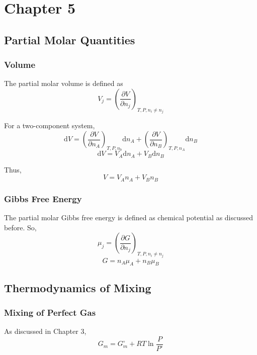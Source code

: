 \documentclass[letterpaper]{article}
\newcommand{\diff}{\mathrm{d}}
\newcommand{\zero}{^\circ}
\begin{document}
\newpage
\section*{Chapter 5}
\subsection*{Partial Molar Quantities}
\subsubsection*{Volume}
The partial molar volume is defined as
\begin{equation*}
    V_j=\left(\frac{\partial V}{\partial n_j}\right)_{T,P,n_i\neq n_j}
\end{equation*}

For a two-component system,
\begin{equation*}
    \diff V=\left(\frac{\partial V}{\partial n_A}\right)_{T,P,n_b}\diff n_A
    +\left(\frac{\partial V}{\partial n_B}\right)_{T,P,n_A}\diff n_B
\end{equation*}
\begin{equation*}
    \diff V=V_A\diff n_A+V_B\diff n_B
\end{equation*}

Thus,
\begin{equation*}
    V=V_An_A+V_Bn_B
\end{equation*}
\subsubsection*{Gibbs Free Energy}
The partial molar Gibbs free energy is defined as chemical potential as discussed before.
So,
\begin{equation*}
    \mu_j=\left(\frac{\partial G}{\partial n_j}\right)_{T,P,n_i\neq n_j}
\end{equation*}
\begin{equation*}
    G=n_A\mu_A+n_B\mu_B
\end{equation*}
\subsection*{Thermodynamics of Mixing}
\subsubsection*{Mixing of Perfect Gas}
As discussed in Chapter 3,
\begin{equation*}
    G_m=G_m\zero+RT\ln\frac{P}{P\zero}
\end{equation*}
\end{document}
